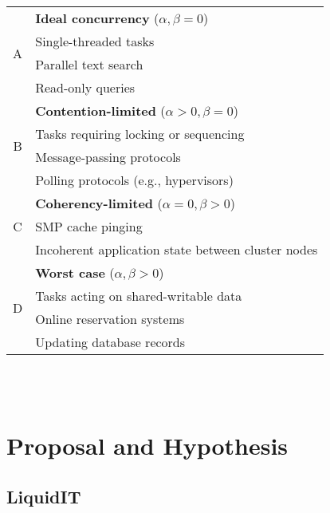 \begin{tabular}{c|l} \hline

\multirow{4}{*}{A} & \textbf{Ideal concurrency} ($\alpha, \beta = 0$)      \\
                   & Single-threaded tasks                                 \\
                   & Parallel text search                                  \\
                   & Read-only queries                                     \\ \hline
\multirow{4}{*}{B} & \textbf{Contention-limited} ($\alpha > 0, \beta = 0$) \\
                   & Tasks requiring locking or sequencing                 \\
                   & Message-passing protocols                             \\
                   & Polling protocols (e.g., hypervisors)                 \\ \hline
\multirow{3}{*}{C} & \textbf{Coherency-limited} ($\alpha = 0, \beta > 0$)  \\
                   & SMP cache pinging                                     \\
                   & Incoherent application state between cluster nodes    \\ \hline
\multirow{4}{*}{D} & \textbf{Worst case} ($\alpha, \beta > 0$)             \\
                   & Tasks acting on shared-writable data                  \\
                   & Online reservation systems                            \\
                   & Updating database records                             \\ \hline
\end{tabular}
\\~\\












\section{Proposal and Hypothesis}

\subsection{LiquidIT}

